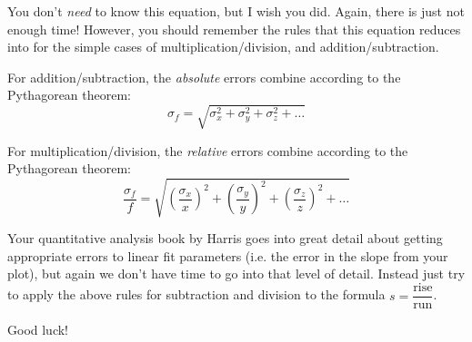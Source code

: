 \documentclass[12pt, openany, letterpaper]{memoir}
\begin{document}
 You don't \emph{need} to know this equation, but I wish you did. Again, there is just not enough time! However, you should remember the rules that this equation reduces into for the simple cases of multiplication/division, and addition/subtraction.
 
 For addition/subtraction, the \emph{absolute} errors combine according to the Pythagorean theorem:
 \begin{equation*}
	 \sigma_f = \sqrt{\sigma_x^2 + \sigma_y^2 + \sigma_z^2 + \ldots}
 \end{equation*}
 
 For multiplication/division, the \emph{relative} errors combine according to the Pythagorean theorem:
 \begin{equation*}
	 \frac{\sigma_f}{f} = \sqrt{\left(\frac{\sigma_x}{x}\right)^2 + \left(\frac{\sigma_y}{y}\right)^2 + \left(\frac{\sigma_z}{z}\right)^2 + \ldots}
 \end{equation*}
 
 Your quantitative analysis book by Harris goes into great detail about getting appropriate errors to linear fit parameters (i.e. the error in the slope from your plot), but again we don't have time to go into that level of detail. Instead just try to apply the above rules for subtraction and division to the formula $s=\dfrac{\text{rise}}{\text{run}}$.
 
\begin{center}
	{\large Good luck!}
\end{center}
\end{document}
